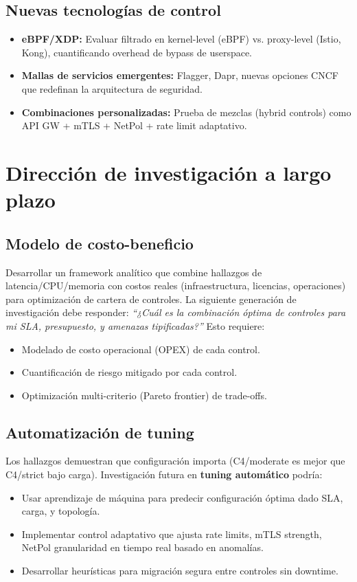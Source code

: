 \subsection{Nuevas tecnologías de control}
\begin{itemize}
	\item \textbf{eBPF/XDP:} Evaluar filtrado en kernel-level (eBPF) vs. proxy-level (Istio, Kong), cuantificando overhead de bypass de userspace.
	\item \textbf{Mallas de servicios emergentes:} Flagger, Dapr, nuevas opciones CNCF que redefinan la arquitectura de seguridad.
	\item \textbf{Combinaciones personalizadas:} Prueba de mezclas (hybrid controls) como API GW + mTLS + NetPol + rate limit adaptativo.
\end{itemize}

\section{Dirección de investigación a largo plazo}

\subsection{Modelo de costo-beneficio}

Desarrollar un framework analítico que combine hallazgos de latencia/CPU/memoria con costos reales (infraestructura, licencias, operaciones) para optimización de cartera de controles. La siguiente generación de investigación debe responder: \textit{``¿Cuál es la combinación óptima de controles para mi SLA, presupuesto, y amenazas tipificadas?''} Esto requiere:
\begin{itemize}
	\item Modelado de costo operacional (OPEX) de cada control.
	\item Cuantificación de riesgo mitigado por cada control.
	\item Optimización multi-criterio (Pareto frontier) de trade-offs.
\end{itemize}

\subsection{Automatización de tuning}

Los hallazgos demuestran que configuración importa (C4/moderate es mejor que C4/strict bajo carga). Investigación futura en \textbf{tuning automático} podría:
\begin{itemize}
	\item Usar aprendizaje de máquina para predecir configuración óptima dado SLA, carga, y topología.
	\item Implementar control adaptativo que ajusta rate limits, mTLS strength, NetPol granularidad en tiempo real basado en anomalías.
	\item Desarrollar heurísticas para migración segura entre controles sin downtime.
\end{itemize}

